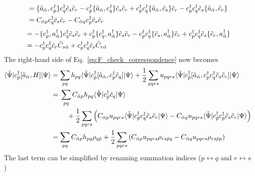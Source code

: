 \documentclass[aip,jcp,preprint,superscriptaddress,nofootinbib]{revtex4-1}
\begin{document}
%
\begin{align}
    [\anniprim{\bar{\alpha}}, \crea{p} \crea{q} \anni{s} \anni{r}] 
    &= \{ \anniprim{\bar{\alpha}}, \crea{p} \} \crea{q} \anni{s} \anni{r} 
     - \crea{p} \{ \anniprim{\bar{\alpha}}, \crea{q} \} \anni{s} \anni{r}
     + \crea{p} \crea{q} \{ \anniprim{\bar{\alpha}}, \anni{s} \} \anni{r}
     - \crea{p} \crea{q} \anni{s} \{ \anniprim{\bar{\alpha}}, \anni{r} \}  \nn
    &= C_{\bar{\alpha} p} \crea{q} \anni{s} \anni{r} - C_{\bar{\alpha} q} \crea{p} \anni{s} \anni{r}
\end{align}
%
\begin{align}
    [\crea{p} \crea{q} \anni{s} \anni{r}, \creaprim{\bar{\alpha}} ] 
    &= 
    - \{ \crea{p}, \creaprim{\bar{\alpha}} \} \crea{q} \anni{s} \anni{r} 
    + \crea{p} \{ \crea{q}, \creaprim{\bar{\alpha}} \} \anni{s} \anni{r}
    - \crea{p} \crea{q} \{ \anni{s}, \creaprim{\bar{\alpha}} \} \anni{r}
    + \crea{p} \crea{q} \anni{s} \{ \anni{r}, \creaprim{\bar{\alpha}} \}  \nn
    &= -\crea{p} \crea{q} \anni{r} \tilde{C}_{s \bar{\alpha}} + \crea{p} \crea{q} \anni{s} \tilde{C}_{r \bar{\alpha}} 
\end{align}
The right-hand side of Eq.~\eqref{eq:F_check_correspondence} now becomes
\begin{align}
    \elm{\tilde{\Psi}}{ \crea{\bar{p}} [\anniprim{\bar{\alpha}}, H] }{\Psi} 
    &= \sum_{pq} h_{pq} \elm{\tilde{\Psi}}{ \crea{\bar{p}} [\anniprim{\bar{\alpha}}, \crea{p} \anni{q}] }{\Psi}
    + \frac{1}{2} \sum_{pqrs} u_{pqrs} \elm{\tilde{\Psi}}{ \crea{\bar{p}} [\anniprim{\bar{\alpha}}, \crea{p} \crea{q} \anni{s} \anni{r}] }{\Psi} \nn
    &= 
    \begin{multlined}[t]
        \sum_{pq} C_{\bar{\alpha} p} h_{pq} \elm{\tilde{\Psi}}{ \crea{\bar{p}} \anni{q} }{\Psi} \\
        + \frac{1}{2} \sum_{pqrs} \left( 
            C_{\bar{\alpha} p} u_{pqrs} \elm{\tilde{\Psi}}{ \crea{\bar{p}} \crea{q} \anni{s} \anni{r} }{\Psi} -
            C_{\bar{\alpha} q} u_{pqrs} \elm{\tilde{\Psi}}{ \crea{\bar{p}} \crea{p} \anni{s} \anni{r} }{\Psi}
        \right)
    \end{multlined} \nn
    &=  \sum_{pq} C_{\bar{\alpha} p} h_{pq} \rho_{q \bar{p}}
    + \frac{1}{2} \sum_{pqrs} \left( 
        C_{\bar{\alpha} p} u_{pqrs} \rho_{rs \bar{p} q} -
        C_{\bar{\alpha} q} u_{pqrs} \rho_{rs \bar{p} p}
    \right) \label{eq:F_check_correspondence_proof_1}
\end{align}
The last term can be simplified by renaming summation indices ($p \leftrightarrow q$ and $r \leftrightarrow s$)
\end{document}
